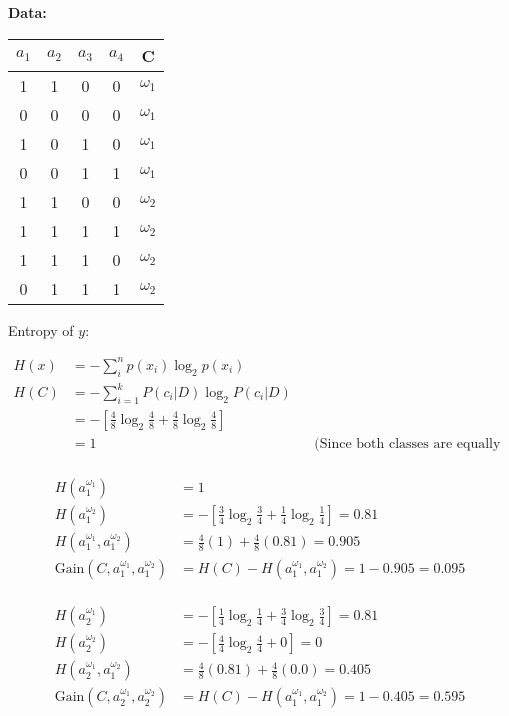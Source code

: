 
\textbf{Data:}
	
\begin{table}[!h]
	\centering
	\begin{tabular}{||c c c c c||} 		
		 \hline
		 $a_{1}$ & $a_{2}$ & $a_{3}$ & $a_{4}$  & C \\ [0.5ex] 
		 \hline \hline
		 1 & 1 & 0 & 0 & $\omega_{1}$ \\
		 \hline
		 0 & 0 & 0 & 0 & $\omega_{1}$ \\
		 \hline
		 1 & 0 & 1 & 0 & $\omega_{1}$ \\
		 \hline
		 0 & 0 & 1 & 1 & $\omega_{1}$ \\
		 \hline
		 1 & 1 & 0 & 0 & $\omega_{2}$ \\
		 \hline
		 1 & 1 & 1 & 1 & $\omega_{2}$ \\
		 \hline
		 1 & 1 & 1 & 0 & $\omega_{2}$ \\
		 \hline
		 0 & 1 & 1 & 1 & $\omega_{2}$ \\
		 \hline
	\end{tabular}	
\end{table}		

Entropy of $y$: 

\begin{align*}
	H(x) & = -\sum_{i}^{n} p(x_{i})\log_{2}p(x_{i}) \\
	H(C) & = -\sum_{i=1}^{k} P(c_{i} | D) \log_{2}P(c_{i} | D) \\
	& = - [\frac{4}{8} \log_{2}{\frac{4}{8}} + \frac{4}{8} \log_{2}{\frac{4}{8}}] \\
	& = 1 && \text{(Since both classes are equally represented (max entropy))} \\
\end{align*}

\begin{align*}
	H(a_{1}^{\omega_{1}}) & = 1 \\ 
	H(a_{1}^{\omega_{2}}) & = - [\frac{3}{4}\log_{2}\frac{3}{4} + \frac{1}{4}\log_{2}\frac{1}{4}] = 0.81 \\		
	H(a_{1}^{\omega_{1}}, a_{1}^{\omega_{2}}) & = \frac{4}{8}(1) + \frac{4}{8}(0.81) = 0.905 \\
	\text{Gain}(C, a_{1}^{\omega_{1}}, a_{1}^{\omega_{2}}) & = H(C) - H(a_{1}^{\omega_{1}}, a_{1}^{\omega_{2}}) = 1 - 0.905 = 0.095 \\		
\end{align*}

\begin{align*}
	H(a_{2}^{\omega_{1}}) & =  - [\frac{1}{4}\log_{2}\frac{1}{4} + \frac{3}{4}\log_{2}\frac{3}{4}] = 0.81 \\ 
	H(a_{2}^{\omega_{2}}) & = - [\frac{4}{4}\log_{2}\frac{4}{4} + 0] = 0 \\		
	H(a_{2}^{\omega_{1}}, a_{1}^{\omega_{2}}) & = \frac{4}{8}(0.81) + \frac{4}{8}(0.0) = 0.405 \\
	\text{Gain}(C, a_{2}^{\omega_{1}}, a_{2}^{\omega_{2}}) & = H(C) - H(a_{1}^{\omega_{1}}, a_{1}^{\omega_{2}}) = 1 - 0.405 = 0.595 \\		
\end{align*}

